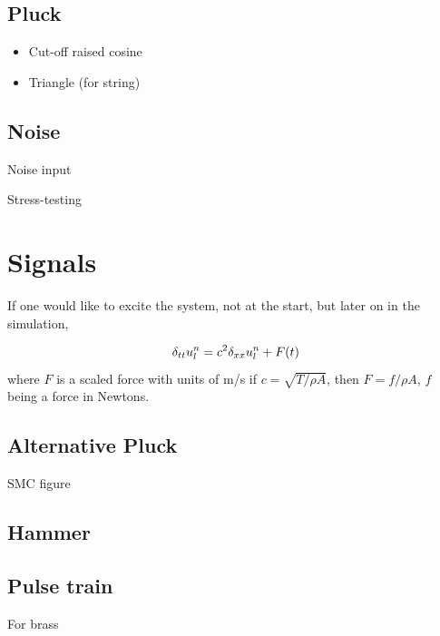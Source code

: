 \subsection{Pluck}\label{sec:pluck}
\begin{itemize}
    \item Cut-off raised cosine
    \item Triangle (for string)
\end{itemize}

\subsection{Noise}
Noise input

Stress-testing

\section{Signals}
If one would like to excite the system, not at the start, but later on in the simulation, 

\begin{equation}
    \delta_{tt} u_l^n = c^2 \delta_{xx} u_l^n + F(t)
\end{equation}
where $F$ is a scaled force with units of m/s
if $c=\sqrt{T/\rho A}$, then $F = f/\rho A$, $f$ being a force in Newtons.


\subsection{Alternative Pluck}
SMC figure

\subsection{Hammer}


\subsection{Pulse train}
For brass


